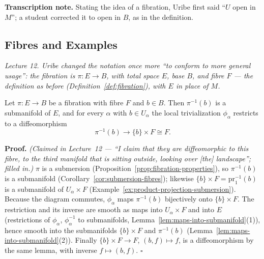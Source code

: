 \documentclass[11pt]{report}
\makeatletter
\newcounter{thmcounter}[section]
\renewenvironment{proof}[1][Proof]{\noindent\textbf{#1.} }{\hfill$\square$\par\vspace{5pt}}
\newcommand{\thmlabel}[1]{\edef\@currentlabel{\arabic{section}.\arabic{thmcounter}}\label{#1}}
\makeatother
\begin{document}
\textbf{Transcription note.} Stating the idea of a fibration, Uribe first said ``$U$ open in $M$''; a student corrected it to open in $B$, as in the definition.

\subsection{Fibres and Examples}\label{sub:fibrations-revisited}

\textit{Lecture 12. Uribe changed the notation once more ``to conform to more general usage'': the fibration is $\pi : E \to B$, with total space $E$, base $B$, and fibre $F$ --- the definition as before (Definition~\ref{def:fibration}), with $E$ in place of $M$.}

\begin{propbox}\thmlabel{prop:fibres-diffeo}
Let $\pi : E \to B$ be a fibration with fibre $F$ and $b \in B$. Then $\pi^{-1}(b)$ is a submanifold of $E$, and for every $\alpha$ with $b \in U_\alpha$ the local trivialization $\phi_\alpha$ restricts to a diffeomorphism
\[
\pi^{-1}(b) \longrightarrow \{b\} \times F \cong F .
\]
\end{propbox}

\begin{proof}
\textit{(Claimed in Lecture~12 --- ``I claim that they are diffeomorphic to this fibre, to the third manifold that is sitting outside, looking over [the] landscape''; filled in.)} $\pi$ is a submersion (Proposition~\ref{prop:fibration-properties}), so $\pi^{-1}(b)$ is a submanifold (Corollary~\ref{cor:submersion-fibres}); likewise $\{b\} \times F = \mathrm{pr}_1^{-1}(b)$ is a submanifold of $U_\alpha \times F$ (Example~\ref{ex:product-projection-submersion}). Because the diagram commutes, $\phi_\alpha$ maps $\pi^{-1}(b)$ bijectively onto $\{b\} \times F$. The restriction and its inverse are smooth as maps into $U_\alpha \times F$ and into $E$ (restrictions of $\phi_\alpha$, $\phi_\alpha^{-1}$ to submanifolds, Lemma~\ref{lem:maps-into-submanifold}(1)), hence smooth into the submanifolds $\{b\} \times F$ and $\pi^{-1}(b)$ (Lemma~\ref{lem:maps-into-submanifold}(2)). Finally $\{b\} \times F \to F$, $(b, f) \mapsto f$, is a diffeomorphism by the same lemma, with inverse $f \mapsto (b, f)$.
\end{proof}

\begin{center}
\end{center}
\end{document}
